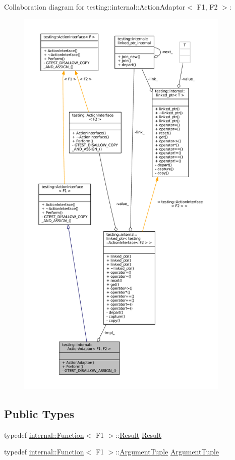 Collaboration diagram for testing\+:\+:internal\+:\+:Action\+Adaptor$<$ F1, F2 $>$\+:
\nopagebreak
\begin{figure}[H]
\begin{center}
\leavevmode
\includegraphics[height=550pt]{classtesting_1_1internal_1_1ActionAdaptor__coll__graph}
\end{center}
\end{figure}
\subsection*{Public Types}
\begin{DoxyCompactItemize}
\item 
typedef \hyperlink{structtesting_1_1internal_1_1Function}{internal\+::\+Function}$<$ F1 $>$\+::\hyperlink{classtesting_1_1internal_1_1ActionAdaptor_afa8f7872b6db3d8f1545fd98b45b0b95}{Result} \hyperlink{classtesting_1_1internal_1_1ActionAdaptor_afa8f7872b6db3d8f1545fd98b45b0b95}{Result}
\item 
typedef \hyperlink{structtesting_1_1internal_1_1Function}{internal\+::\+Function}$<$ F1 $>$\+::\hyperlink{classtesting_1_1internal_1_1ActionAdaptor_a4f78fb73f97b72fea8a93b78a8ab5704}{Argument\+Tuple} \hyperlink{classtesting_1_1internal_1_1ActionAdaptor_a4f78fb73f97b72fea8a93b78a8ab5704}{Argument\+Tuple}
\end{DoxyCompactItemize}
